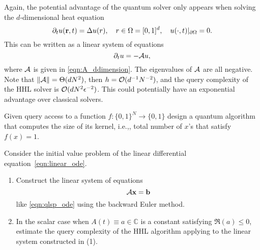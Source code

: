 Again, the potential advantage of the quantum solver only appears when solving the $d$-dimensional heat equation
\begin{equation}
\partial_t u(\mathbf{r},t)=\Delta u(r), \quad r\in \Omega=[0,1]^d, \quad u(\cdot,t)|_{\partial \Omega}=0.
\end{equation}
This can be written as a linear system of equations
\begin{equation}
\partial_t u=-\mathcal{A} u, 
\end{equation}
where $\mathcal{A}$ is given in \cref{eqn:A_ddimension}. 
The eigenvalues of $\mathcal{A}$ are all negative.
Note that $\left\lVert\mathcal{A}\right\rVert=\Theta(dN^2)$, then $h=\mathcal{O}(d^{-1}N^{-2})$, and the query complexity of the HHL solver is $\mathcal{O}(dN^2 \epsilon^{-2})$.
This could potentially have an exponential advantage over classical solvers.

\vspace{2em}

\begin{exer} Given query access to a function $f:\{0,1\}^N \rightarrow \{0,1\}$ design a quantum algorithm that computes the size of its kernel, i.e.,, total number of $x$'s that satisfy $f(x)=1$. 
\end{exer}


\begin{exer}
Consider the initial value problem of the linear differential equation~\cref{eqn:linear_ode}. 
\begin{enumerate}
    \item Construct the linear system of equations 
    \[
    \mathbf{\mathcal{A}} \mathbf{x} = \mathbf{b}
    \]
    like \cref{eqn:qlsp_ode} using the backward Euler method.
    \item In the scalar case when $A(t) \equiv a \in \mathbb{C}$ is a constant satisfying $\Re(a) \leq 0$, estimate the query complexity of the HHL algorithm applying to the linear system constructed in (1).
\end{enumerate}
\end{exer}
